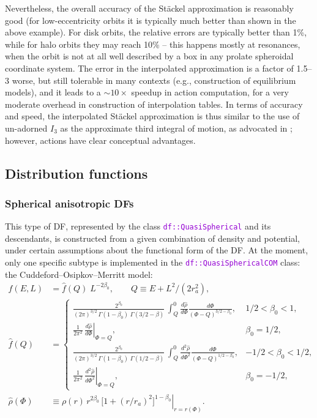 \documentclass[12pt]{article}
\newcommand{\ttt}[1]{\textcolor{darkviolet}{\texttt{#1}}}
\begin{document}
Nevertheless, the overall accuracy of the St\"ackel approximation is reasonably good (for low-eccentricity orbits it is typically much better than shown in the above example). For disk orbits, the relative errors are typically better than 1\%, while for halo orbits they may reach 10\% -- this happens mostly at resonances, when the orbit is not at all well described by a box in any prolate spheroidal coordinate system. The error in the interpolated approximation is a factor of 1.5--3 worse, but still tolerable in many contexts (e.g., construction of equilibrium models), and it leads to a $\sim 10\times$ speedup in action computation, for a very moderate overhead in construction of interpolation tables. In terms of accuracy and speed, the interpolated St\"ackel approximation is thus similar to the use of un-adorned $I_3$ as the approximate third integral of motion, as advocated in \cite{Bienayme2015}; however, actions have clear conceptual advantages.

\subsection{Distribution functions}  \label{sec:DFdetails}

\subsubsection{Spherical anisotropic DFs}  \label{sec:DFsphericalDetails}

This type of DF, represented by the class \ttt{df::QuasiSpherical} and its descendants, is constructed from a given combination of density and potential, under certain assumptions about the functional form of the DF. At the moment, only one specific subtype is implemented in the \ttt{df::QuasiSphericalCOM} class: the Cuddeford--Osipkov--Merritt model:
\begin{align}  \label{eq:DFanisotropic}
f(E,L) &= \hat f(Q) \; L^{-2\beta_0}, \qquad Q\equiv E + L^2 / (2 r_a^2) , \\[3mm]
\hat f(Q) &= \left\{  \begin{array}{ll}
\displaystyle \frac{2^{\beta_0}}{(2\pi)^{3/2}\, \Gamma(1-\beta_0)\; \Gamma(3/2-\beta)}\,
\int_Q^0 \frac{d\hat\rho}{d\Phi} \frac{d\Phi}{(\Phi - Q)^{3/2-\beta_0}}, &
1/2<\beta_0<1, \\[7mm]
\displaystyle \frac{1}{2\pi^2}\, 
\left. \frac{d\hat\rho}{d\Phi} \right|_{\Phi=Q}, &
\beta_0=1/2, \\[7mm]
\displaystyle \frac{2^{\beta_0}}{(2\pi)^{3/2}\, \Gamma(1-\beta_0)\; \Gamma(1/2-\beta)}\,
\int_Q^0 \frac{d^2\hat\rho}{d\Phi^2} \frac{d\Phi}{(\Phi - Q)^{1/2-\beta_0}}, &
-1/2<\beta_0<1/2, \\[7mm]
\displaystyle \frac{1}{2\pi^2}\, 
\left. \frac{d^2\hat\rho}{d\Phi^2} \right|_{\Phi=Q} , &
\beta_0=-1/2,
\end{array} \right. \nonumber \\[3mm]
\hat\rho(\Phi) &\equiv \left. \rho(r) \,r^{2\beta_0}\, \big[1 + (r/r_a)^2\big]^{1-\beta_0} \right|_{r=r(\Phi)}.  \nonumber
\end{align}
\end{document}
